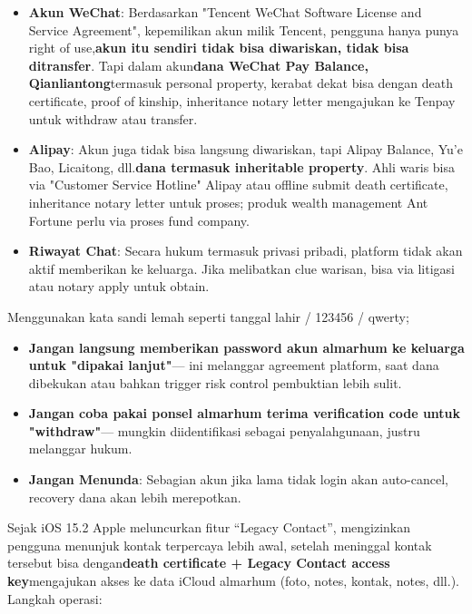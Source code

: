 \begin{itemize}
  \item \textbf{Akun WeChat}: Berdasarkan "Tencent WeChat Software License and Service Agreement", kepemilikan akun milik Tencent, pengguna hanya punya right of use,\textbf{akun itu sendiri tidak bisa diwariskan, tidak bisa ditransfer}. Tapi dalam akun\textbf{dana WeChat Pay Balance, Qianliantong}termasuk personal property, kerabat dekat bisa dengan death certificate, proof of kinship, inheritance notary letter mengajukan ke Tenpay untuk withdraw atau transfer.
  \item \textbf{Alipay}: Akun juga tidak bisa langsung diwariskan, tapi Alipay Balance, Yu'e Bao, Licaitong, dll.\textbf{dana termasuk inheritable property}. Ahli waris bisa via "Customer Service Hotline" Alipay atau offline submit death certificate, inheritance notary letter untuk proses; produk wealth management Ant Fortune perlu via proses fund company.
  \item \textbf{Riwayat Chat}: Secara hukum termasuk privasi pribadi, platform tidak akan aktif memberikan ke keluarga. Jika melibatkan clue warisan, bisa via litigasi atau notary apply untuk obtain.
\end{itemize}

\begin{tcbwarn}{Menggunakan kata sandi lemah seperti tanggal lahir / 123456 / qwerty;}
\begin{itemize}
  \item \textbf{Jangan langsung memberikan password akun almarhum ke keluarga untuk "dipakai lanjut"}— ini melanggar agreement platform, saat dana dibekukan atau bahkan trigger risk control pembuktian lebih sulit.
  \item \textbf{Jangan coba pakai ponsel almarhum terima verification code untuk "withdraw"}— mungkin diidentifikasi sebagai penyalahgunaan, justru melanggar hukum.
  \item \textbf{Jangan Menunda}: Sebagian akun jika lama tidak login akan auto-cancel, recovery dana akan lebih merepotkan.
\end{itemize}

\end{tcbwarn}


Sejak iOS 15.2 Apple meluncurkan fitur “Legacy Contact”, mengizinkan pengguna menunjuk kontak terpercaya lebih awal, setelah meninggal kontak tersebut bisa dengan\textbf{death certificate + Legacy Contact access key}mengajukan akses ke data iCloud almarhum (foto, notes, kontak, notes, dll.). Langkah operasi:

